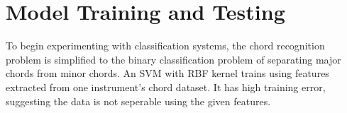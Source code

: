\documentclass{article}
\begin{document}
\section{Model Training and Testing}
To begin experimenting with classification systems, the chord recognition problem is simplified to the binary classification problem of separating major chords from
minor chords. An SVM with RBF kernel trains using features extracted from one instrument's chord dataset. It has high training error, suggesting the data is not
seperable using the given features.

\begin{thebibliography}{1}

\end{thebibliography}
\end{document}
